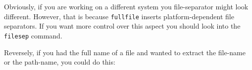 Obviously, if you are working on a different system you file-separator might look different.
However, that is because \lstinline{fullfile} inserts platform-dependent file separators.
If you want more control over this aspect you should look into the \lstinline{filesep} command.

Reversely, if you had the full name of a file and wanted to extract the file-name or the path-name, you could do this: